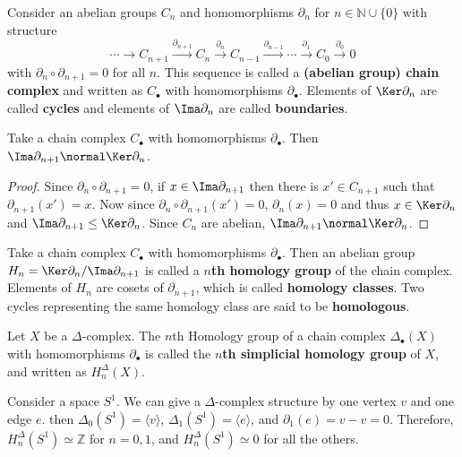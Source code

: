 \begin{defn} Consider an abelian groups $C_n$ and homomorphisms $\partial_n$ for $n\in \mathbb{N}\cup \{0\}$ with structure
\begin{equation}
\cdots\rightarrow C_{n+1}\xrightarrow{\partial_{n+1}}C_{n}\xrightarrow{\partial_n}C_{n-1}\xrightarrow{\partial_{n-1}}\cdots\xrightarrow{\partial_1} C_0\xrightarrow{\partial_0} 0
\end{equation}
with $\partial_{n}\circ \partial_{n+1}=0$ for all $n$. This sequence is called a \textbf{(abelian group) chain complex} and written as $C_\bullet$ with homomorphisms $\partial_\bullet$. Elements of $\Ker\partial_n$ are called \textbf{cycles} and elements of $\Ima\partial_n$ are called \textbf{boundaries}.
\end{defn}
\begin{prop} Take a chain complex $C_\bullet$ with homomorphisms $\partial_\bullet$. Then $\Ima\partial_{n+1}\normal \Ker\partial_n$.
\end{prop}
\begin{proof} Since $\partial_{n}\circ \partial_{n+1}=0$, if $x\in \Ima\partial_{n+1}$ then there is $x'\in C_{n+1}$ such that $\partial_{n+1}(x')=x$. Now since $\partial_{n}\circ \partial_{n+1}(x')=0$, $\partial_{n}(x)=0$ and thus $x\in\Ker\partial_{n}$ and $\Ima\partial_{n+1}\leq \Ker\partial_n$. Since $C_n$ are abelian, $\Ima\partial_{n+1}\normal \Ker\partial_n$.
\end{proof}
\begin{defn} Take a chain complex $C_\bullet$ with homomorphisms $\partial_\bullet$. Then an abelian group $H_n=\Ker\partial_n/\Ima\partial_{n+1}$ is called a \textbf{$n$th homology group} of the chain complex. Elements of $H_n$ are cosets of $\partial_{n+1}$, which is called \textbf{homology classes}. Two cycles representing the same homology class are said to be \textbf{homologous}.
\end{defn}
\begin{defn} Let $X$ be a $\Delta$-complex. The $n$th Homology group of a chain complex $\Delta_\bullet(X)$ with homomorphisms $\partial_\bullet$ is called the \textbf{$n$th simplicial homology group} of $X$, and written as $H_n^\Delta(X)$.
\end{defn}
\begin{exmp} Consider a space $S^1$. We can give a $\Delta$-complex structure by one vertex $v$ and one edge $e$. then $\Delta_0(S^1)=\langle v\rangle$, $\Delta_1(S^1)=\langle e\rangle$, and $\partial_1(e)=v-v=0$. Therefore, $H_n^\Delta(S^1)\simeq \mathbb{Z}$ for $n=0,1$, and $H_n^\Delta(S^1)\simeq 0$ for all the others.
\end{exmp}
